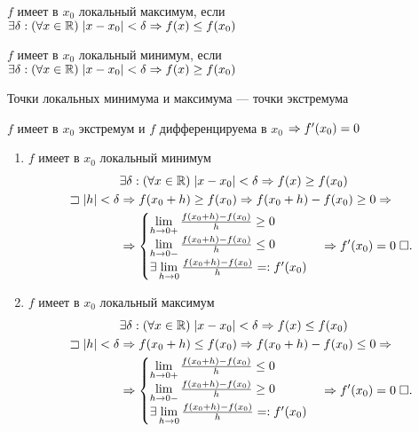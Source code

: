 \documentclass{article}
\begin{document}


$f$ имеет в $x_0$ локальный максимум, если $\exists\delta:(\forall x\in\mathbb{R})\;|x-x_0|<\delta\Rightarrow f(x)\leq f(x_0)$

$f$ имеет в $x_0$ локальный минимум, если $\exists\delta:(\forall x\in\mathbb{R})\;|x-x_0|<\delta\Rightarrow f(x)\geq f(x_0)$

Точки локальных минимума и максимума --- точки экстремума

\theorem[Ферма]

$f$ имеет в $x_0$ экстремум и $f$ дифференцируема в $x_0$ $\Rightarrow f'(x_0)=0$

\proof
\begin{enumerate}
	\item$f$ имеет в $x_0$ локальный минимум
	\begin{align*}
		 & \exists\delta: (\forall x\in\mathbb{R})\;|x-x_0|<\delta\Rightarrow f(x)\geq f(x_0) \\
		\sqsupset |h| < \delta
		 & \Rightarrow f(x_0+h)\geq f(x_0) \Rightarrow f(x_0+h)-f(x_0) \geq 0\Rightarrow          \\
		 & \Rightarrow\begin{cases}
			        \lim\limits_{h\to0+}\frac{f(x_0+h)-f(x_0)}{h}\geq0 \\
			        \lim\limits_{h\to0-}\frac{f(x_0+h)-f(x_0)}{h}\leq0 \\
			        \exists\lim\limits_{h\to0}\frac{f(x_0+h)-f(x_0)}{h}=:f'(x_0)
		        \end{cases} \Rightarrow f'(x_0)=0\;\square.
	\end{align*}
	\item$f$ имеет в $x_0$ локальный максимум
	\begin{align*}
		 & \exists\delta: (\forall x\in\mathbb{R})\;|x-x_0|<\delta\Rightarrow f(x)\leq f(x_0) \\
		\sqsupset |h| < \delta
		 & \Rightarrow f(x_0+h)\leq f(x_0) \Rightarrow f(x_0+h)-f(x_0) \leq 0\Rightarrow          \\
		 & \Rightarrow\begin{cases}
			        \lim\limits_{h\to0+}\frac{f(x_0+h)-f(x_0)}{h}\leq0 \\
			        \lim\limits_{h\to0-}\frac{f(x_0+h)-f(x_0)}{h}\geq0 \\
			        \exists\lim\limits_{h\to0}\frac{f(x_0+h)-f(x_0)}{h}=:f'(x_0)
		        \end{cases} \Rightarrow f'(x_0)=0\;\square.
	\end{align*}
\end{enumerate}
\end{document}
